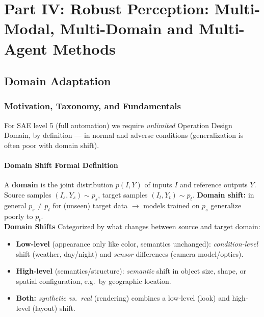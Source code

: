\documentclass{article}
\begin{document}
\newpage
\section{Part IV: Robust Perception: Multi-Modal, Multi-Domain and Multi-Agent Methods}
\subsection{Domain Adaptation}
\subsubsection{Motivation, Taxonomy, and Fundamentals}
For SAE level 5 (full automation) we require \textit{unlimited} Operation Design Domain, by definition --- in normal and adverse conditions (generalization is often poor with domain shift).

\paragraph{Domain Shift Formal Definition} A \textbf{domain} is the joint distribution $p(I,Y)$ of inputs $I$ and reference outputs $Y$. Source samples $(I_s,Y_s)\sim p_s$, target samples $(I_t,Y_t)\sim p_t$. \textbf{Domain shift:} in general $p_s\neq p_t$ for (unseen) target data $\rightarrow$ models trained on $p_s$ generalize poorly to $p_t$.\\

\textbf{Domain Shifts} Categorized by what changes between source and target domain:
\begin{itemize}
    \item \textbf{Low-level} (appearance only like color, semantics unchanged): \textit{condition-level} shift (weather, day/night) and \textit{sensor} differences (camera model/optics).
    \item \textbf{High-level} (semantics/structure): \textit{semantic} shift in object size, shape, or spatial configuration, e.g.\ by geographic location.
    \item \textbf{Both:} \textit{synthetic vs.\ real} (rendering) combines a low-level (look) and high-level (layout) shift.
\end{itemize}
\end{document}
